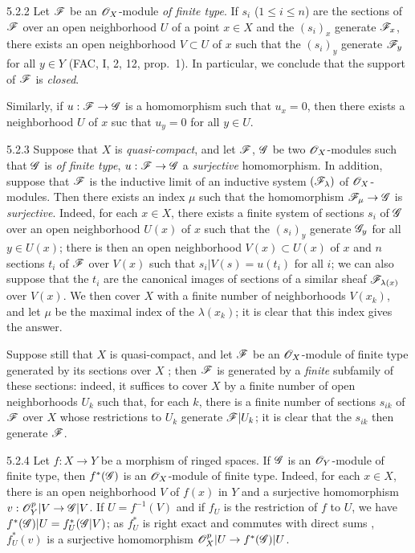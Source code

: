 \begin{env}{5.2.2}
\label{env-0.5.2.2}
Let $\mathscr{F}$ be an $\mathscr{O}_X$-module \emph{of finite type}. If $s_i$ ($1\leqslant i\leqslant n$)
are the sections of $\mathscr{F}$ over an open neighborhood $U$ of a point $x\in X$ and the
$(s_i)_x$ generate $\mathscr{F}_x$, there exists an open neighborhood $V\subset U$ of $x$ such
that the $(s_i)_y$ generate $\mathscr{F}_y$ for all $y\in Y$ (FAC, I, 2, 12, prop.~1). In
particular, we conclude that the support of $\mathscr{F}$ is \emph{closed}.

Similarly, if $u:\mathscr{F}\to\mathscr{G}$ is a homomorphism such that $u_x=0$, then there exists a
neighborhood $U$ of $x$ suc that $u_y=0$ for all $y\in U$.
\end{env}

\begin{env}{5.2.3}
\label{env-0.5.2.3}
Suppose that $X$ is \emph{quasi-compact}, and let $\mathscr{F}$, $\mathscr{G}$ be two $\mathscr{O}_X$-modules
such that $\mathscr{G}$ is \emph{of finite type}, $u:\mathscr{F}\to\mathscr{G}$ a \emph{surjective}
homomorphism. In addition, suppose that $\mathscr{F}$ is the inductive limit of an inductive
system $(\mathscr{F}_\lambda)$ of $\mathscr{O}_X$-modules. Then there exists an index $\mu$ such that the
homomorphism $\mathscr{F}_\mu\to\mathscr{G}$ is \emph{surjective}. Indeed, for each $x\in X$, there
exists a finite system of sections $s_i$ of $\mathscr{G}$ over an open neighborhood $U(x)$ of $x$
such that the $(s_i)_y$ generate $\mathscr{G}_y$ for all $y\in U(x)$; there is then an open
neighborhood $V(x)\subset U(x)$ of $x$ and $n$ sections $t_i$ of $\mathscr{F}$ over $V(x)$ such
that $s_i|V(s)=u(t_i)$ for all $i$; we can also suppose that the $t_i$ are the canonical
images of sections of a similar sheaf $\mathscr{F}_{\lambda(x)}$ over $V(x)$. We then cover $X$
with a finite number of neighborhoods $V(x_k)$, and let $\mu$ be the maximal index of the
$\lambda(x_k)$; it is clear that this index gives the answer.

Suppose still that $X$ is quasi-compact, and let $\mathscr{F}$ be an $\mathscr{O}_X$-module of finite type
generated by its sections over $X$ ; then $\mathscr{F}$ is generated by a
\emph{finite} subfamily of these sections: indeed, it suffices to cover $X$ by a finite
number of open neighborhoods $U_k$ such that, for each $k$, there is a finite number of
sections $s_{ik}$ of $\mathscr{F}$ over $X$ whose restrictions to $U_k$ generate $\mathscr{F}|U_k$; it
is clear that the $s_{ik}$ then generate $\mathscr{F}$.
\end{env}

\begin{env}{5.2.4}
\label{env-0.5.2.4}
Let $f:X\to Y$ be a morphism of ringed spaces. If $\mathscr{G}$ is an $\mathscr{O}_Y$-module of finite
type, then $f^*(\mathscr{G})$ is an $\mathscr{O}_X$-module of finite type. Indeed, for each $x\in X$,
there is an open neighborhood $V$ of $f(x)$ in $Y$ and a surjective homomorphism
$v:\mathscr{O}_Y^p|V\to\mathscr{G}|V$. If $U=f^{-1}(V)$ and if $f_U$ is the restriction of $f$ to $U$, we
have $f^*(\mathscr{G})|U=f_U^*(\mathscr{G}|V)$; as $f_U^*$ is right exact  and
commutes with direct sums , $f_U^*(v)$ is a surjective homomorphism
$\mathscr{O}_X^p|U\to f^*(\mathscr{G})|U$.
\end{env}

